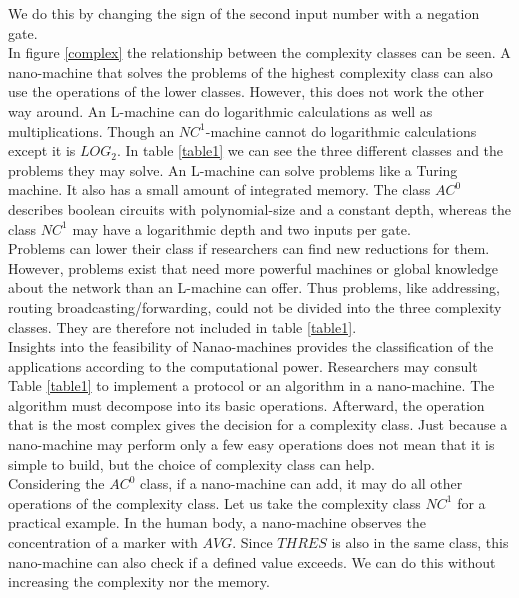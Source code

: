 \documentclass[10pt,sigconf]{acmart}
\begin{document}
We do this by changing the sign of the second input number with a negation gate. \\
In figure \ref{complex} the relationship between the complexity classes can be seen.
A nano-machine that solves the problems of the highest complexity class can also use the operations of the lower classes.
However, this does not work the other way around.
An L-machine can do logarithmic calculations as well as multiplications.
Though an $NC^1$-machine cannot do logarithmic calculations except it is $LOG_2$.  
In table \ref{table1} we can see the three different classes and the problems they may solve.
An L-machine can solve problems like a Turing machine. It also has a small amount of integrated memory.
The class $AC^0$ describes boolean circuits with polynomial-size and a constant depth, whereas the class $NC^1$ may have a logarithmic depth and two inputs per gate.\\ 
Problems can lower their class if researchers can find new reductions for them. 
However, problems exist that need more powerful machines or global knowledge about the network than an L-machine can offer.
Thus problems, like addressing, routing broadcasting/forwarding, could not be divided into the three complexity classes.
They are therefore not included in table \ref{table1}.\\
Insights into the feasibility of Nanao-machines provides the classification of the applications according to the computational power. 
Researchers may consult Table \ref{table1} to implement a protocol or an algorithm in a nano-machine. 
The algorithm must decompose into its basic operations. Afterward, the operation that is the most complex gives the decision for a complexity class.
Just because a nano-machine may perform only a few easy operations does not mean that it is simple to build, but the choice of complexity class can help.\\
Considering the $AC^0$ class, if a nano-machine can add, it may do all other operations of the complexity class.
Let us take the complexity class $NC^1$ for a practical example. In the human body, a nano-machine observes the concentration of a marker with $AVG$.
Since $THRES$ is also in the same class, this nano-machine can also check if a defined value exceeds. We can do this without increasing the complexity nor the memory.
\end{document}
